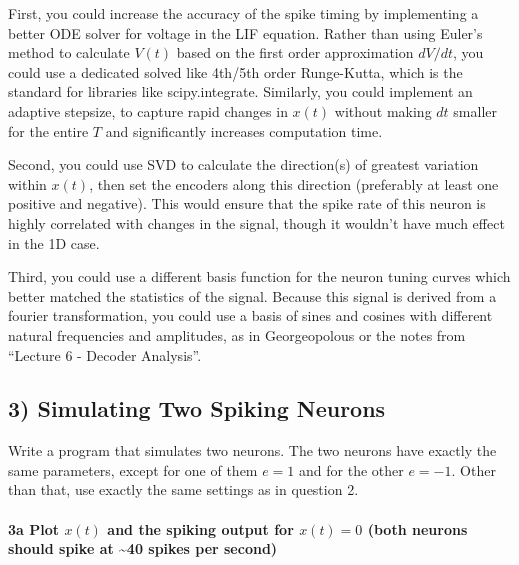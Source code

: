 \documentclass{article}
\begin{document}
    First, you could increase the accuracy of the spike timing by
implementing a better ODE solver for voltage in the LIF equation. Rather
than using Euler's method to calculate $V(t)$ based on the first order
approximation $dV/dt$, you could use a dedicated solved like 4th/5th
order Runge-Kutta, which is the standard for libraries like
scipy.integrate. Similarly, you could implement an adaptive stepsize, to
capture rapid changes in $x(t)$ without making $dt$ smaller for the
entire $T$ and significantly increases computation time.

Second, you could use SVD to calculate the direction(s) of greatest
variation within $x(t)$, then set the encoders along this direction
(preferably at least one positive and negative). This would ensure that
the spike rate of this neuron is highly correlated with changes in the
signal, though it wouldn't have much effect in the 1D case.

Third, you could use a different basis function for the neuron tuning
curves which better matched the statistics of the signal. Because this
signal is derived from a fourier transformation, you could use a basis
of sines and cosines with different natural frequencies and amplitudes,
as in Georgeopolous or the notes from ``Lecture 6 - Decoder Analysis''.

    \subsection{3) Simulating Two Spiking
Neurons}\label{simulating-two-spiking-neurons}

Write a program that simulates two neurons. The two neurons have exactly
the same parameters, except for one of them $e=1$ and for the other
$e=-1$. Other than that, use exactly the same settings as in question 2.

    \paragraph{3a Plot $x(t)$ and the spiking output for $x(t)=0$ (both
neurons should spike at \textasciitilde{}40 spikes per
second)}\label{a-plot-xt-and-the-spiking-output-for-xt0-both-neurons-should-spike-at-40-spikes-per-second}
\end{document}
